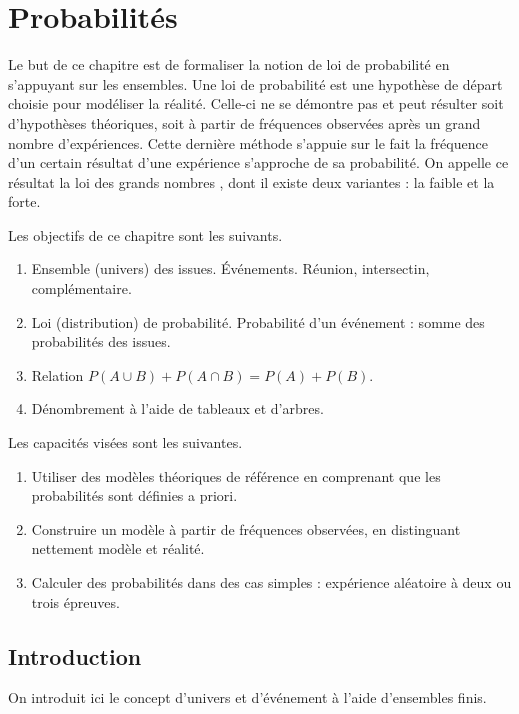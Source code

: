\chapter{Probabilités}

Le but de ce chapitre est de formaliser la notion de loi de probabilité en s'appuyant sur les ensembles.
Une loi de probabilité est une hypothèse de départ choisie pour modéliser la réalité.
Celle-ci ne se démontre pas et peut résulter soit d'hypothèses théoriques, soit à partir de fréquences observées après un grand nombre d'expériences.
Cette dernière méthode s'appuie sur le fait la fréquence d'un certain résultat d'une expérience s'approche de sa probabilité.
On appelle ce résultat la \og loi des grands nombres \fg, dont il existe deux variantes : la faible et la forte.

Les objectifs de ce chapitre sont les suivants.
	\begin{enumerate}
		\item Ensemble (univers) des issues. Événements. Réunion, intersectin, complémentaire.
		\item Loi (distribution) de probabilité. Probabilité d'un événement : somme des probabilités des issues.
		\item Relation $P(A \cup B) + P(A \cap B) = P(A) + P(B)$.
		\item Dénombrement à l'aide de tableaux et d'arbres.
	\end{enumerate}
Les capacités visées sont les suivantes.
	\begin{enumerate}
		\item Utiliser des modèles théoriques de référence en comprenant que les probabilités sont définies a priori.
		\item Construire un modèle à partir de fréquences observées, en distinguant nettement modèle et réalité.
		\item Calculer des probabilités dans des cas simples : expérience aléatoire à deux ou trois épreuves.
	\end{enumerate}

\section{Introduction}

On introduit ici le concept d'univers et d'événement à l'aide d'ensembles finis.


